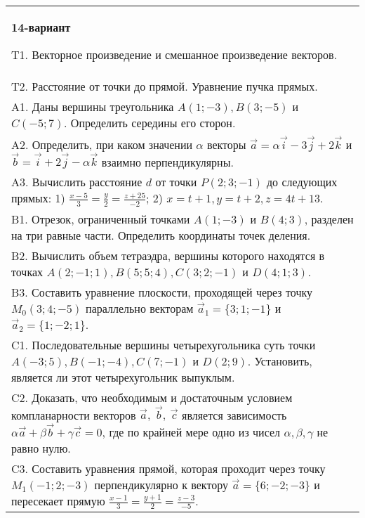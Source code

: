 \documentclass{article}
\begin{document}
\begin{tabular}{m{17cm}}
\textbf{14-вариант}
\newline

T1. 
Векторное произведение и смешанное произведение векторов.
 \\
T2. 
Расстояние от точки до прямой. Уравнение пучка прямых.
 \\
A1. 
Даны вершины треугольника \(A(1; - 3),B(3; - 5)\) и \(C( - 5;7)\). Определить середины его сторон.
 \\
A2. 
Определить, при каком значении \(\alpha\) векторы \(\overrightarrow{a} = \alpha\overrightarrow{i} - 3\overrightarrow{j} + 2\overrightarrow{k}\) и \(\overrightarrow{b} = \overrightarrow{i} + 2\overrightarrow{j} - \alpha\overrightarrow{k}\) взаимно перпендикулярны.
 \\
A3. 
Вычислить расстояние \(d\) от точки \(P(2;3; - 1)\) до следующих прямых: 1) \(\frac{x - 5}{3} = \frac{y}{2} = \frac{z + 25}{- 2}\); 2) \(x = t + 1,y = t + 2,z = 4t + 13\).
 \\
B1. 
Отрезок, ограниченный точками \(A(1; - 3)\) и \(B(4;3)\), разделен на три равные части. Определить координаты точек деления.
 \\
B2. 
Вычислить объем тетраэдра, вершины которого находятся в точках \(A(2; - 1;1),B(5;5;4),C(3;2; - 1)\) и \(D(4;1;3)\). \\
B3. Составить уравнение плоскости, проходящей через точку \(M_{0}(3;4; - 5)\) параллельно векторам \({\overrightarrow{a}}_{1} = \{ 3;1; - 1\}\) и \({\overrightarrow{a}}_{2} = \{ 1; - 2;1\}\).
 \\
C1. 
Последовательные вершины четырехугольника суть точки \(A( - 3;5),B( - 1; - 4),C(7; - 1)\) и \(D(2;9)\). Установить, является ли этот четырехугольник выпуклым.
 \\
C2. 
Доказать, что необходимым и достаточным условием компланарности векторов \(\overrightarrow{a},\ \overrightarrow{b},\ \overrightarrow{c}\) является зависимость \(\alpha\overrightarrow{a} + \beta\overrightarrow{b} + \gamma\overrightarrow{c} = 0\), где по крайней мере одно из чисел \(\alpha,\beta,\gamma\) не равно нулю.
 \\
C3. 
Составить уравнения прямой, которая проходит через точку \(M_{1}( - 1;2; - 3)\) перпендикулярно к вектору \(\overrightarrow{a} = \{ 6; - 2; - 3\}\) и пересекает прямую \(\frac{x - 1}{3} = \frac{y + 1}{2} = \frac{z - 3}{- 5}\).
 \\

\end{tabular}
\vspace{1cm}
\end{document}
